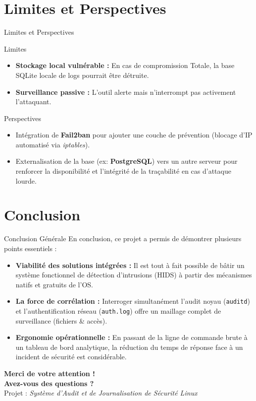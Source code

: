 \documentclass[10pt]{beamer}
\begin{document}
\section{Limites et Perspectives}
\begin{frame}{Limites et Perspectives}
    \begin{block}{Limites}
        \begin{itemize}
            \item \textbf{Stockage local vulnérable : } En cas de compromission Totale, la base SQLite locale de logs pourrait être détruite.
            \item \textbf{Surveillance passive : } L'outil alerte mais n'interrompt pas activement l'attaquant.
        \end{itemize}
    \end{block}
    \vspace{0.2cm}
    \begin{block}{Perspectives}
        \begin{itemize}
            \item Intégration de \textbf{Fail2ban} pour ajouter une couche de prévention (blocage d'IP automatisé via \textit{iptables}).
            \item Externalisation de la base (ex: \textbf{PostgreSQL}) vers un autre serveur pour renforcer la disponibilité et l'intégrité de la traçabilité en cas d'attaque lourde.
        \end{itemize}
    \end{block}
\end{frame}

\section{Conclusion}
\begin{frame}{Conclusion Générale}
    En conclusion, ce projet a permis de démontrer plusieurs points essentiels :
    \vspace{0.3cm}
    \begin{itemize}
        \item \textbf{Viabilité des solutions intégrées :} Il est tout à fait possible de bâtir un système fonctionnel de détection d'intrusions (HIDS) à partir des mécanismes natifs et gratuits de l'OS.
        \item \textbf{La force de corrélation :} Interroger simultanément l'audit noyau (\texttt{auditd}) et l'authentification réseau (\texttt{auth.log}) offre un maillage complet de surveillance (fichiers \& accès).
        \item \textbf{Ergonomie opérationnelle :} En passant de la ligne de commande brute à un tableau de bord analytique, la réduction du temps de réponse face à un incident de sécurité est considérable.
    \end{itemize}
\end{frame}

\begin{frame}
    \centering
    \Huge \textbf{Merci de votre attention !}\\
    \vspace{1cm}
    \Large \textbf{Avez-vous des questions ?}\\
    \vspace{1cm}
    \normalsize Projet : \textit{Système d'Audit et de Journalisation de Sécurité Linux}
\end{frame}
\end{document}
